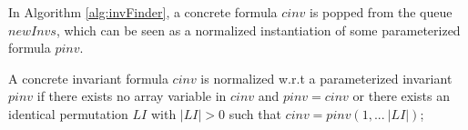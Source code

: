 \documentclass[conference]{IEEEtran}
\newcommand\lyj[1]{\textcolor{magenta}{#1}}
\newcommand\caicomment[1]{\textcolor{blue}{comment: #1} }
\begin{document}
{%


In Algorithm \ref{alg:invFinder}, a concrete formula $cinv$ is popped from the queue $newInvs$, which can be seen as a normalized instantiation of some parameterized formula $pinv$. %

\vspace{-5pt}
\begin{definition}
A  concrete invariant formula $cinv$ is normalized w.r.t a parameterized invariant $pinv$ if  there exists no array variable in $cinv$ and $pinv=cinv$ or there exists an identical permutation $LI$ with $|LI|>0$ such that $cinv=pinv(1,...~|LI|)$;


\end{definition}}
\end{document}
